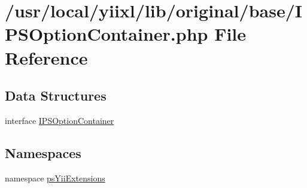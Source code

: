 \hypertarget{IPSOptionContainer_8php}{
\section{/usr/local/yiixl/lib/original/base/IPSOptionContainer.php File Reference}
\label{IPSOptionContainer_8php}
}
\subsection*{Data Structures}
\begin{DoxyCompactItemize}
\item 
interface \hyperlink{interfaceIPSOptionContainer}{IPSOptionContainer}
\end{DoxyCompactItemize}
\subsection*{Namespaces}
\begin{DoxyCompactItemize}
\item 
namespace \hyperlink{namespacepsYiiExtensions}{psYiiExtensions}
\end{DoxyCompactItemize}
